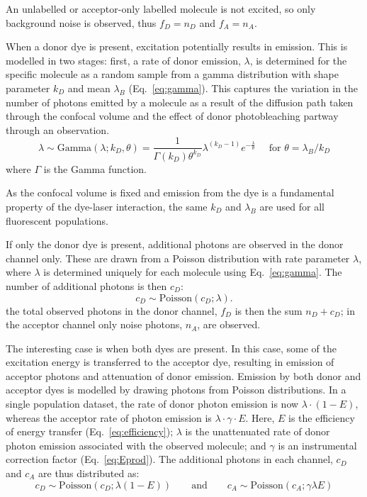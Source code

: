 An unlabelled or acceptor-only labelled molecule is not excited, so only background noise is observed, thus $f_D = n_D$ and $f_A = n_A$.

When a donor dye is present, excitation potentially results in emission. This is modelled in two stages: first, a rate of donor emission, $\lambda$, is determined for the specific molecule as a random sample from a gamma distribution with shape parameter $k_D$ and mean $\lambda_B$ (Eq.~\ref{eq:gamma}). This captures the variation in the number of photons emitted by a molecule as a result of the diffusion path taken through the confocal volume and the effect of donor photobleaching partway through an observation.
\begin{equation}
\lambda \sim \text{Gamma}(\lambda; k_D, \theta) =  \frac{1}{\Gamma(k_D) \theta^{k_D}} \lambda^{(k_D - 1)} e^{-\frac{\lambda}{\theta}} \quad\text{ for } \theta = \lambda_B / k_D
\label{eq:gamma}
\end{equation} 
where $\Gamma$ is the Gamma function. 

As the confocal volume is fixed and emission from the dye is a fundamental property of the dye-laser interaction, the same $k_D$ and $\lambda_B$ are used for all fluorescent populations. 

If only the donor dye is present, additional photons are observed in the donor channel only. These are drawn from a Poisson distribution with rate parameter $\lambda$, where $\lambda$ is determined uniquely for each molecule using Eq.~\ref{eq:gamma}. The number of additional photons is then $c_D$:
\begin{equation}
c_D \sim \text{Poisson}(c_{D}; \lambda). 
\end{equation}
the total observed photons in the donor channel, $f_D$ is then the sum $n_D + c_D$; in the acceptor channel only noise photons, $n_A$, are observed.

The interesting case is when both dyes are present.  In this case, some of the excitation energy is transferred to the acceptor dye, resulting in emission of acceptor photons and attenuation of donor emission.  Emission by both donor and acceptor dyes is modelled by drawing photons from Poisson distributions. In a single population dataset, the rate of donor photon emission is now $\lambda\cdot(1-E)$, whereas the acceptor rate of photon emission is $\lambda \cdot \gamma \cdot E$. Here, $E$ is the efficiency of energy transfer (Eq.~\ref{eq:efficiency}); $\lambda$ is the unattenuated rate of donor photon emission associated with the observed molecule; and $\gamma$ is an instrumental correction factor (Eq.~\ref{eq:Eprod}). The additional photons in each channel, $c_D$ and $c_A$ are thus distributed as:
\begin{equation}
c_D \sim \text{Poisson}(c_D; \lambda (1-E)) \qquad \text{and} \qquad c_A \sim \text{Poisson}(c_A; \gamma \lambda E)
\end{equation}

